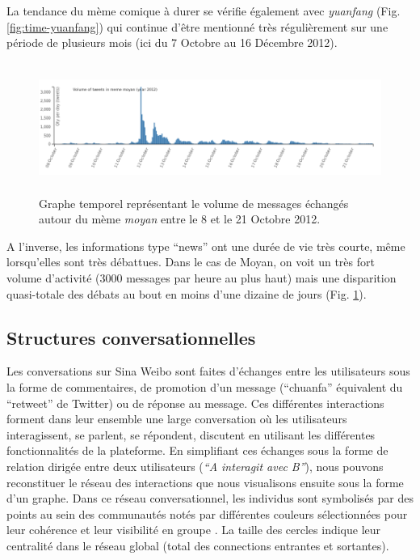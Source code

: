 La tendance du m\`eme comique \`a durer se v\'erifie \'egalement avec
\textit{yuanfang} (Fig. \ref{fig:time-yuanfang}) qui continue d{\textquoteright}\^etre mentionn\'e
tr\`es r\'eguli\`erement sur une p\'eriode de plusieurs mois (ici du 7
Octobre au 16 D\'ecembre 2012).

\begin{figure}[h!]
    \centering
    \includegraphics[width=6.0087in,height=1.6697in]{figures/chap4/chapitre4-img6.png}
    \caption{
      Graphe temporel repr\'esentant le volume de messages \'echang\'es autour du m\`eme \textit{moyan} entre le 8 et le 21 Octobre 2012.
    }
    \label{fig:time-moyan}
\end{figure}

A l{\textquoteright}inverse, les informations type {\textquotedblleft}news{\textquotedblright} ont une dur\'ee de vie tr\`es courte, m\^eme lorsqu{\textquoteright}elles sont tr\`es d\'ebattues. Dans le cas de Moyan, on voit un tr\`es fort volume d{\textquoteright}activit\'e (3000 messages par heure au plus haut) mais une disparition quasi-totale des d\'ebats au bout en moins d{\textquoteright}une dizaine de jours (Fig. \ref{fig:time-moyan}).

\subsection[Structures conversationnelles]{Structures conversationnelles}

Les conversations sur Sina Weibo sont faites d{\textquoteright}\'echanges entre les utilisateurs sous la forme de commentaires, de promotion d{\textquoteright}un message ({\textquotedblleft}chuanfa{\textquotedblright} \'equivalent du {\textquotedblleft}retweet{\textquotedblright} de Twitter) ou de r\'eponse au message. Ces diff\'erentes interactions forment dans leur ensemble une large conversation o\`u les utilisateurs interagissent, se parlent, se r\'epondent, discutent en utilisant les diff\'erentes fonctionnalit\'es de la plateforme. En simplifiant ces \'echanges sous la forme de relation dirig\'ee entre deux utilisateurs (\textit{{\textquotedblleft}A interagit avec B{\textquotedblright}}), nous pouvons reconstituer le r\'eseau des interactions que nous visualisons ensuite sous la forme d{\textquoteright}un graphe. Dans ce réseau conversationnel, les individus sont symbolisés par des points au sein des communautés notés par différentes couleurs sélectionnées pour leur cohérence et leur visibilité en groupe \citep{Lin2013}. La taille des cercles indique leur centralité dans le réseau global (total des connections entrantes et sortantes). 


